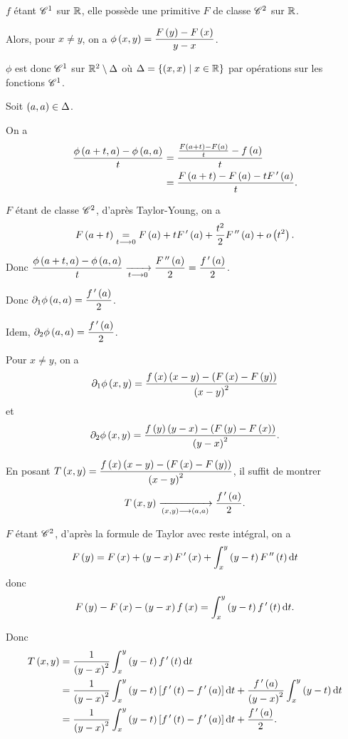 \begin{corr}
\(f\) étant \(\mathscr{C}^{1}\) sur \(\mathbb{R}\), elle possède une primitive \(F\) de classe \(\mathscr{C}^{2}\) sur \(\mathbb{R}\).

Alors, pour \(x\not=y\), on a \(\phi\left(x,y\right)=\dfrac{F\left(y\right)-F\left(x\right)}{y-x}\).

\(\phi\) est donc \(\mathscr{C}^{1}\) sur \(\mathbb{R}^2\setminus\Delta\) où \(\Delta=\left\lbrace\left(x,x\right)\;\middle|\; x\in\mathbb{R}\right\rbrace\) par opérations sur les fonctions \(\mathscr{C}^{1}\).

Soit \(\left(a,a\right)\in\Delta\).

On a \[\begin{aligned}
\dfrac{\phi\left(a+t,a\right)-\phi\left(a,a\right)}{t}&=\dfrac{\frac{F\left(a+t\right)-F\left(a\right)}{t}-f\left(a\right)}{t} \\
&=\dfrac{F\left(a+t\right)-F\left(a\right)-tF^{\,\prime}\left(a\right)}{t}.
\end{aligned}\]

\(F\) étant de classe \(\mathscr{C}^{2}\), d'après Taylor-Young, on a \[F\left(a+t\right)\underset{t\longrightarrow0}{=}F\left(a\right)+tF^{\,\prime}\left(a\right)+\dfrac{t^2}{2}F^{\,\prime\prime}\left(a\right)+o\left(t^2\right).\]

Donc \(\dfrac{\phi\left(a+t,a\right)-\phi\left(a,a\right)}{t}\xrightarrow[t\longrightarrow0]{}\dfrac{F^{\,\prime\prime}\left(a\right)}{2}=\dfrac{f^{\,\prime}\left(a\right)}{2}\).

Donc \(\pdif{1}\phi\paren{a,a}=\dfrac{f\prim\paren{a}}{2}\).

Idem, \(\pdif{2}\phi\paren{a,a}=\dfrac{f\prim\paren{a}}{2}\).

Pour \(x\not=y\), on a \[\pdif{1}\phi\paren{x,y}=\dfrac{f\paren{x}\paren{x-y}-\paren{F\paren{x}-F\paren{y}}}{\paren{x-y}^2}\] et \[\pdif{2}\phi\paren{x,y}=\dfrac{f\paren{y}\paren{y-x}-\paren{F\paren{y}-F\paren{x}}}{\paren{y-x}^2}.\]

En posant \(T\left(x,y\right)=\dfrac{f\left(x\right)\left(x-y\right)-\left(F\left(x\right)-F\left(y\right)\right)}{\left(x-y\right)^2}\), il suffit de montrer \[T\left(x,y\right)\xrightarrow[\left(x,y\right)\longrightarrow\left(a,a\right)]{}\dfrac{f^{\,\prime}\left(a\right)}{2}.\]

\(F\) étant \(\mathscr{C}^{2}\), d'après la formule de Taylor avec reste intégral, on a \[F\paren{y}=F\paren{x}+\paren{y-x}F\prim\paren{x}+\int_x^y\paren{y-t}F\seconde\paren{t}\odif{t}\] donc \[F\paren{y}-F\paren{x}-\paren{y-x}f\paren{x}=\int_x^y\paren{y-t}f\prim\paren{t}\odif{t}.\]

Donc \[\begin{aligned}
T\paren{x,y}&=\dfrac{1}{\paren{y-x}^2}\int_x^y\paren{y-t}f\prim\paren{t}\odif{t} \\
&=\dfrac{1}{\paren{y-x}^2}\int_x^y\paren{y-t}\croch{f\prim\paren{t}-f\prim\paren{a}}\odif{t}+\dfrac{f\prim\paren{a}}{\paren{y-x}^2}\int_x^y\paren{y-t}\odif{t} \\
&=\dfrac{1}{\paren{y-x}^2}\int_x^y\paren{y-t}\croch{f\prim\paren{t}-f\prim\paren{a}}\odif{t}+\dfrac{f\prim\paren{a}}{2}.
\end{aligned}\]


\end{corr}
